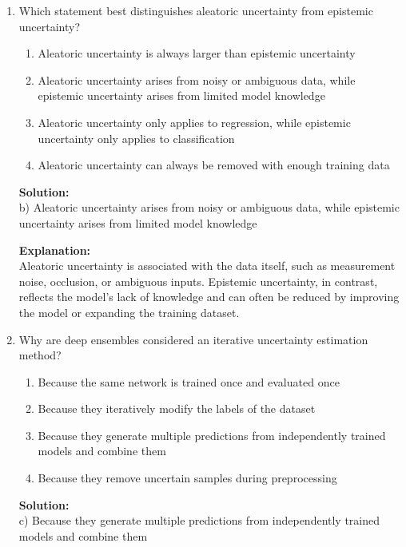 \documentclass{article}
\begin{document}
\begin{enumerate}
\vspace{2mm}

\item Which statement best distinguishes aleatoric uncertainty from epistemic uncertainty?

\begin{enumerate}
    \item Aleatoric uncertainty is always larger than epistemic uncertainty
    \item Aleatoric uncertainty arises from noisy or ambiguous data, while epistemic uncertainty arises from limited model knowledge
    \item Aleatoric uncertainty only applies to regression, while epistemic uncertainty only applies to classification
    \item Aleatoric uncertainty can always be removed with enough training data
\end{enumerate}

\textbf{Solution:} \\
b) Aleatoric uncertainty arises from noisy or ambiguous data, while epistemic uncertainty arises from limited model knowledge

\textbf{Explanation:} \\
Aleatoric uncertainty is associated with the data itself, such as measurement noise, occlusion, or ambiguous inputs. Epistemic uncertainty, in contrast, reflects the model's lack of knowledge and can often be reduced by improving the model or expanding the training dataset.

\vspace{2mm}

\item Why are deep ensembles considered an iterative uncertainty estimation method?

\begin{enumerate}
    \item Because the same network is trained once and evaluated once
    \item Because they iteratively modify the labels of the dataset
    \item Because they generate multiple predictions from independently trained models and combine them
    \item Because they remove uncertain samples during preprocessing
\end{enumerate}

\textbf{Solution:} \\
c) Because they generate multiple predictions from independently trained models and combine them


\end{enumerate}
\end{document}
